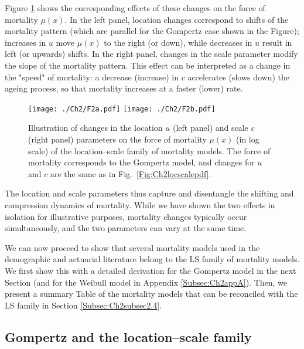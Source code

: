 \documentclass[Thesis]{subfiles}
\begin{document}
Figure \ref{Fig:Ch2locscaleMU} shows the corresponding effects of these changes on the force of mortality $\mu(x)$. In the left panel, location changes correspond to shifts of the mortality pattern (which are parallel for the Gompertz case shown in the Figure); increases in $u$ move $\mu(x)$ to the right (or down), while decreases in $u$ result in left (or upwards) shifts. In the right panel, changes in the scale parameter modify the slope of the mortality pattern. This effect can be interpreted as a change in the "speed" of mortality: a decrease (increase) in $c$ accelerates (slows down) the ageing process, so that mortality increases at a faster (lower) rate.

\begin{figure}[!ht]
	\centering
	\texttt{[image: ./Ch2/F2a.pdf]}
	\texttt{[image: ./Ch2/F2b.pdf]}
	
	\caption{Illustration of changes in the location $u$ (left panel) and scale $c$ (right panel) parameters on the force of mortality $\mu(x)$ (in log scale) of the location--scale family of mortality models. The force of mortality corresponds to the Gompertz model, and changes for $u$ and $c$ are the same as in Fig.~\ref{Fig:Ch2locscalepdf}.}\label{Fig:Ch2locscaleMU}
	
\end{figure}

The location and scale parameters thus capture and disentangle the shifting and compression dynamics of mortality. While we have shown the two effects in isolation for illustrative purposes, mortality changes typically occur simultaneously, and the two parameters can vary at the same time.

We can now proceed to show that several mortality models used in the demographic and actuarial literature belong to the LS family of mortality models. We first show this with a detailed derivation for the Gompertz model in the next Section (and for the Weibull model in Appendix \ref{Subsec:Ch2appA}). Then, we present a summary Table of the mortality models that can be reconciled with the LS family in Section \ref{Subsec:Ch2subsec2.4}.

\subsection{Gompertz and the location--scale family}
\label{Subsec:Ch2subsec2.3}
\end{document}
